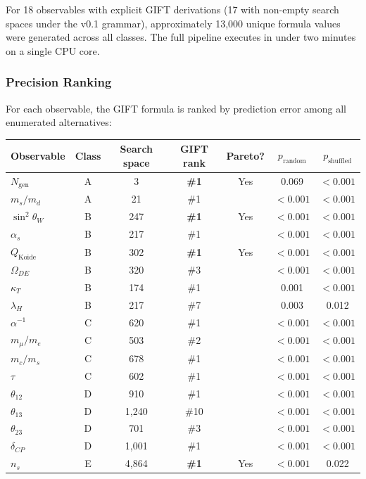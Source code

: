 \documentclass[11pt,a4paper]{article}
\newcommand{\CP}{\mathrm{CP}}
\newcommand{\DE}{\mathrm{DE}}
\def\CP{CP}%
\def\DE{DE}%
\begin{document}
For 18 observables with explicit GIFT derivations (17 with non-empty search spaces under the v0.1 grammar), approximately 13,000 unique formula values were generated across all classes. The full pipeline executes in under two minutes on a single CPU core.

\subsubsection{Precision Ranking}

For each observable, the GIFT formula is ranked by prediction error among all enumerated alternatives:

\begin{table}[H]
\centering
\small
\begin{tabular}{lcccccc}
\toprule
Observable & Class & Search space & GIFT rank & Pareto? & $p_{\mathrm{random}}$ & $p_{\mathrm{shuffled}}$ \\
\midrule
$N_{\mathrm{gen}}$ & A & 3 & \textbf{\#1} & Yes & 0.069 & $< 0.001$ \\
$m_s/m_d$ & A & 21 & \#1 & & $< 0.001$ & $< 0.001$ \\
$\sin^2\theta_W$ & B & 247 & \textbf{\#1} & Yes & $< 0.001$ & $< 0.001$ \\
$\alpha_s$ & B & 217 & \#1 & & $< 0.001$ & $< 0.001$ \\
$Q_{\mathrm{Koide}}$ & B & 302 & \textbf{\#1} & Yes & $< 0.001$ & $< 0.001$ \\
$\Omega_{\DE}$ & B & 320 & \#3 & & $< 0.001$ & $< 0.001$ \\
$\kappa_T$ & B & 174 & \#1 & & 0.001 & $< 0.001$ \\
$\lambda_H$ & B & 217 & \#7 & & 0.003 & 0.012 \\
$\alpha^{-1}$ & C & 620 & \#1 & & $< 0.001$ & $< 0.001$ \\
$m_\mu/m_e$ & C & 503 & \#2 & & $< 0.001$ & $< 0.001$ \\
$m_c/m_s$ & C & 678 & \#1 & & $< 0.001$ & $< 0.001$ \\
$\tau$ & C & 602 & \#1 & & $< 0.001$ & $< 0.001$ \\
$\theta_{12}$ & D & 910 & \#1 & & $< 0.001$ & $< 0.001$ \\
$\theta_{13}$ & D & 1,240 & \#10 & & $< 0.001$ & $< 0.001$ \\
$\theta_{23}$ & D & 701 & \#3 & & $< 0.001$ & $< 0.001$ \\
$\delta_{\CP}$ & D & 1,001 & \#1 & & $< 0.001$ & $< 0.001$ \\
$n_s$ & E & 4,864 & \textbf{\#1} & Yes & $< 0.001$ & 0.022 \\
\bottomrule
\end{tabular}
\end{table}
\end{document}
